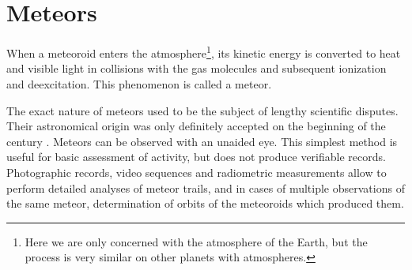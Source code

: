 
\section{Meteors} \label{il}
    When a meteoroid enters the atmosphere\footnote{Here we are only concerned with the atmosphere of the Earth,
    but the process is very similar on other planets with atmospheres.}, its kinetic energy
    is converted to heat and visible light in collisions with the gas molecules and subsequent ionization
    and deexcitation. This phenomenon is called a meteor.

    The exact nature of meteors used to be the subject of lengthy scientific disputes.
    Their astronomical origin was only definitely accepted on the beginning of the  century \citep{czegka2000}.
    Meteors can be observed with an unaided eye. This simplest method is useful for basic assessment of activity,
    but does not produce verifiable records. Photographic records, video sequences and radiometric measurements
    allow to perform detailed analyses of meteor trails, 
    and in cases of multiple observations of the same meteor, determination of orbits of the meteoroids which produced them.

